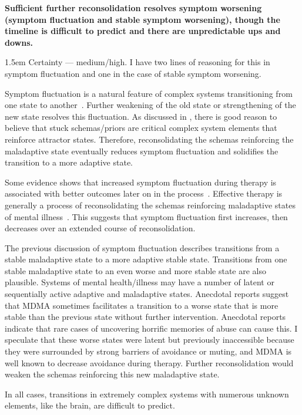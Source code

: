 \documentclass[11pt,oneside]{book}
\let\cite\parencite
\newcommand{\claim}[2]{%
    \par\medskip\noindent\textbf{#1}%
    \begin{adjustwidth}{1.5em}{}%
    \setlength{\parindent}{0pt}%
    \setlength{\parskip}{0.5\baselineskip}%
    #2%
    \end{adjustwidth}%
}
\begin{document}
\claim{Sufficient further reconsolidation resolves symptom worsening (symptom fluctuation and stable symptom worsening), though the timeline is difficult to predict and there are unpredictable ups and downs.}{Certainty --- medium/high. I have two lines of reasoning for this in symptom fluctuation and one in the case of stable symptom worsening.

Symptom fluctuation is a natural feature of complex systems transitioning from one state to another~\cite{hayes2020complex}. Further weakening of the old state or strengthening of the new state resolves this fluctuation. As discussed in \textcite{eckerUnlocking}, there is good reason to believe that stuck schemas/priors are critical complex system elements that reinforce attractor states. Therefore, reconsolidating the schemas reinforcing the maladaptive state eventually reduces symptom fluctuation and solidifies the transition to a more adaptive state.

Some evidence shows that increased symptom fluctuation during therapy is associated with better outcomes later on in the process~\cite{olthofDestabilization}. Effective therapy is generally a process of reconsolidating the schemas reinforcing maladaptive states of mental illness~\cite{eckerUnlocking}. This suggests that symptom fluctuation first increases, then decreases over an extended course of reconsolidation.

The previous discussion of symptom fluctuation describes transitions from a stable maladaptive state to a more adaptive stable state. Transitions from one stable maladaptive state to an even worse and more stable state are also plausible. Systems of mental health/illness may have a number of latent or sequentially active adaptive and maladaptive states. Anecdotal reports suggest that MDMA sometimes facilitates a transition to a worse state that is more stable than the previous state without further intervention. Anecdotal reports indicate that rare cases of uncovering horrific memories of abuse can cause this. I speculate that these worse states were latent but previously inaccessible because they were surrounded by strong barriers of avoidance or muting, and MDMA is well known to decrease avoidance during therapy. Further reconsolidation would weaken the schemas reinforcing this new maladaptive state.

In all cases, transitions in extremely complex systems with numerous unknown elements, like the brain, are difficult to predict.}
\end{document}

